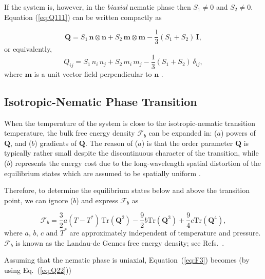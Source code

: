 \documentclass[nottitlepage]{article}
\begin{document}
If the system is, however, in the {\it biaxial} nematic phase then $S_1\neq 0$ and $S_2\neq 0$. Equation (\ref{eq:Q111}) can be written compactly as

\begin{equation} \label{eq:Q11}
\mathbf{Q}=S_1\,\mathbf{n}\otimes \mathbf{n}+S_2\,\mathbf{m}\otimes \mathbf{m}-\frac{1}{3}(S_1+S_2)\,\mathbf{I},
 \end{equation}
 or equivalently,
\begin{equation}\label{eq:Q2}
Q_{ij}=S_1\,n_i\,n_j+S_2\,m_i\,m_j-\frac{1}{3}(S_1+S_2)\,\delta_{ij},
\end{equation}
where $\mathbf{m}$ is a unit vector field perpendicular to $\mathbf{n}$ \cite{Mottram}.


\subsection { %
Isotropic-Nematic Phase Transition}

When the temperature of the system is close to the isotropic-nematic transition temperature, the bulk free energy density $\mathcal{F}_b$ can be expanded in: ($a$) powers of $\mathbf{Q}$, and ($b$) gradients of $\mathbf{Q}$. The reason of ($a$) is that the order parameter $\mathbf{Q}$ is typically rather small despite the discontinuous character of the transition, while ($b$) represents the energy cost due to the long-wavelength spatial distortion of the equilibrium states which are assumed to be spatially uniform \cite{de gennes}.

Therefore, to determine the equilibrium states below and above the transition point, we can ignore ($b$) and express $\mathcal{F}_b$  as

\begin{equation}\label{eq:F3}
\mathcal{F}_{b}=\frac{3}{2}a(T-T^{*})\, \mathrm{Tr}(\mathbf{Q}^2)-\frac{9}{2}b\mathrm{Tr}(\mathbf{Q}^3)+\frac{9}{4}c\mathrm{Tr}(\mathbf{Q}^4),
\end{equation}
where $a$, $b$, $c$ and $T^{*}$ are approximately independent of temperature and pressure. $\mathcal{F}_{b}$ is known as the Landau-de Gennes free energy density; see Refs.~\cite{Mottram, and}.

Assuming that the nematic phase is uniaxial, Equation~(\ref{eq:F3}) becomes (by using Eq.~(\ref{eq:Q22}))
\end{document}
